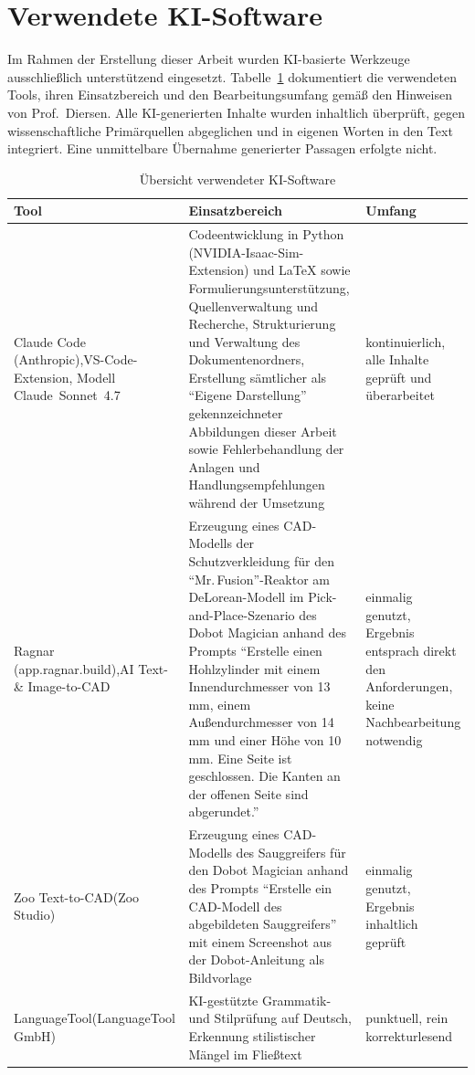 \section{Verwendete KI-Software}
\label{anhang:ki}
Im Rahmen der Erstellung dieser Arbeit wurden KI-basierte Werkzeuge ausschließlich unterstützend eingesetzt.
Tabelle~\ref{tab:ki} dokumentiert die verwendeten Tools, ihren Einsatzbereich und den Bearbeitungsumfang gemäß den Hinweisen von Prof.\ Diersen.
Alle KI-generierten Inhalte wurden inhaltlich überprüft, gegen wissenschaftliche Primärquellen abgeglichen und in eigenen Worten in den Text integriert.
Eine unmittelbare Übernahme generierter Passagen erfolgte nicht.
\begin{table}[H]
\centering
\caption{Übersicht verwendeter KI-Software}
\label{tab:ki}
\begin{tabularx}{\textwidth}{p{3.2cm}Xp{3.3cm}}
\toprule
\textbf{Tool} & \textbf{Einsatzbereich} & \textbf{Umfang} \\
\midrule
Claude Code (Anthropic),\newline VS-Code-Extension, Modell Claude~Sonnet~4.7
  & Codeentwicklung in Python (NVIDIA-Isaac-Sim-Extension) und \LaTeX{} sowie Formulierungsunterstützung, Quellenverwaltung und Recherche, Strukturierung und Verwaltung des Dokumentenordners, Erstellung sämtlicher als \enquote{Eigene Darstellung} gekennzeichneter Abbildungen dieser Arbeit sowie Fehlerbehandlung der Anlagen und Handlungsempfehlungen während der Umsetzung
  & kontinuierlich, alle Inhalte geprüft und überarbeitet \\
Ragnar (app.ragnar.build),\newline AI Text- \& Image-to-CAD
  & Erzeugung eines CAD-Modells der Schutzverkleidung für den \enquote{Mr.\,Fusion}-Reaktor am DeLorean-Modell im Pick-and-Place-Szenario des Dobot Magician anhand des Prompts \enquote{Erstelle einen Hohlzylinder mit einem Innendurchmesser von 13\,mm, einem Außendurchmesser von 14\,mm und einer Höhe von 10\,mm. Eine Seite ist geschlossen. Die Kanten an der offenen Seite sind abgerundet.}
  & einmalig genutzt, Ergebnis entsprach direkt den Anforderungen, keine Nachbearbeitung notwendig \\
Zoo Text-to-CAD\newline (Zoo Studio)
  & Erzeugung eines CAD-Modells des Sauggreifers für den Dobot Magician anhand des Prompts \enquote{Erstelle ein CAD-Modell des abgebildeten Sauggreifers} mit einem Screenshot aus der Dobot-Anleitung als Bildvorlage
  & einmalig genutzt, Ergebnis inhaltlich geprüft \\
LanguageTool\newline (LanguageTool GmbH)
  & KI-gestützte Grammatik- und Stilprüfung auf Deutsch, Erkennung stilistischer Mängel im Fließtext
  & punktuell, rein korrekturlesend \\
\bottomrule
\end{tabularx}
\end{table}


